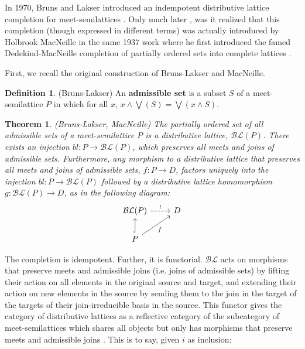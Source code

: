 \documentclass[hoptionsi,review,screen,format=sigconf]{acmart}
\newtheorem{theorem}{Theorem}[section]
\theoremstyle{definition}
\newtheorem{definition}{Definition}[section]
\newcommand{\BLc}{\mathcal{BL}}
\begin{document}
In 1970, Bruns and Lakser introduced an indempotent distributive lattice completion for meet-semilattices \cite{bruns1970injective}. Only much later \cite{ball2016dedekind}, was it realized that this completion (though expressed in different terms) was actually introduced by  Holbrook MacNeille in the same 1937 work where he first introduced the famed Dedekind-MacNeille completion of partially ordered sets into complete lattices \cite{macneille1937partially}. 

First, we recall the original construction of Bruns-Lakser and MacNeille.

\begin{definition}
(Bruns-Lakser) An \textbf{admissible set} is a subset \(S\) of a meet-semilattice \(P\) in which for all \(x\), \(x \wedge \bigvee(S) = \bigvee(x \wedge S)\).
\end{definition}

\begin{theorem}
(Bruns-Lakser, MacNeille) The partially ordered set of all admissible sets of a meet-semilattice \(P\) is a distributive lattice, \(\BLc(P)\). There exists an injection \(bl : P \rightarrow \BLc(P)\), which preserves all meets and joins of admissible sets. Furthermore, any morphism to a distributive lattice that preserves all meets and joins of admissible sets, \(f : P \rightarrow D\), factors uniquely into the injection \(bl : P \rightarrow \BLc(P)\) followed by a distributive lattice homomorphism \(g : \BLc(P) \rightarrow D\), as in the following diagram:
\begin{equation*}
\begin{tikzcd}
\BLc(P) \arrow[r, "!",dashed]            & D \\
P \arrow[u, hook] \arrow[ru, "f"'] &
\end{tikzcd}
\end{equation*}

\end{theorem}

The completion is idempotent. Further, it is functorial. \(\BLc\) acts on morphisms that preserve meets and admissible joins (i.e. joins of admissible sets) by lifting their action on all elements in the original source and target, and extending their action on new elements in the source by sending them to the join in the target of the targets of their join-irreducible basis in the source. This functor gives the category of distributive lattices as a reflective category of the subcategory of meet-semilattices which shares all objects but only has morphisms that preserve meets and admissible joins \cite{gehrke2014distributive}. This is to say, given \(i\) as inclusion:
\end{document}
